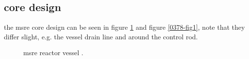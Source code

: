 \documentclass{article}
\begin{document}
\begin{preview}
\section{core design}
the msre core design can be seen in figure \ref{3229-fig1} and figure \ref{0378-fig1}, note that they differ slight, e.g. the vessel drain line and around the control rod.
\begin{figure}[H]
  \centering
  \caption{msre reactor vessel \parencite[figure 1]{ornl-tm-3229}.}
  \label{3229-fig1}
\end{figure}
\begin{figure}[H]
  \centering

\end{figure}
\end{preview}
\end{document}
